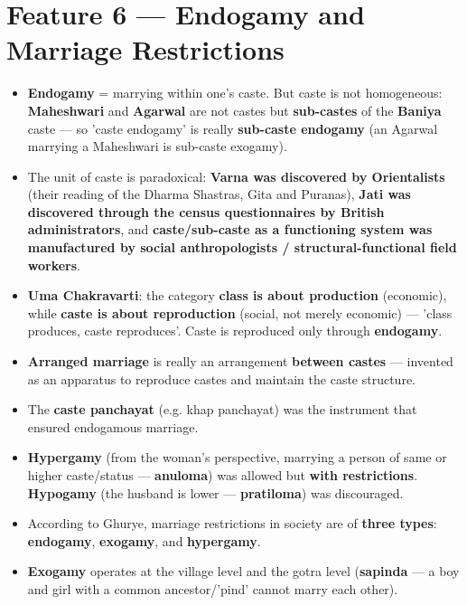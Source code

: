 \section{Feature 6 --- Endogamy and Marriage Restrictions}

\begin{KeyConcept}
\begin{itemize}
\item \textbf{Endogamy} = marrying within one's caste. But caste is not homogeneous: \textbf{Maheshwari} and \textbf{Agarwal} are not castes but \textbf{sub-castes} of the \textbf{Baniya} caste --- so 'caste endogamy' is really \textbf{sub-caste endogamy} (an Agarwal marrying a Maheshwari is sub-caste exogamy).
\item The unit of caste is paradoxical: \textbf{Varna was discovered by Orientalists} (their reading of the Dharma Shastras, Gita and Puranas), \textbf{Jati was discovered through the census questionnaires by British administrators}, and \textbf{caste/sub-caste as a functioning system was manufactured by social anthropologists / structural-functional field workers}.
\end{itemize}
\end{KeyConcept}

\begin{KeyConcept}
\begin{itemize}
\item \textbf{Uma Chakravarti}: the category \textbf{class is about production} (economic), while \textbf{caste is about reproduction} (social, not merely economic) --- 'class produces, caste reproduces'. Caste is reproduced only through \textbf{endogamy}.
\item \textbf{Arranged marriage} is really an arrangement \textbf{between castes} --- invented as an apparatus to reproduce castes and maintain the caste structure.
\item The \textbf{caste panchayat} (e.g. khap panchayat) was the instrument that ensured endogamous marriage.
\end{itemize}
\end{KeyConcept}

\begin{KeyConcept}
\begin{itemize}
\item \textbf{Hypergamy} (from the woman's perspective, marrying a person of same or higher caste/status --- \textbf{anuloma}) was allowed but \textbf{with restrictions}. \textbf{Hypogamy} (the husband is lower --- \textbf{pratiloma}) was discouraged.
\item According to Ghurye, marriage restrictions in society are of \textbf{three types}: \textbf{endogamy}, \textbf{exogamy}, and \textbf{hypergamy}.
\item \textbf{Exogamy} operates at the village level and the gotra level (\textbf{sapinda} --- a boy and girl with a common ancestor/'pind' cannot marry each other).
\end{itemize}
\end{KeyConcept}

